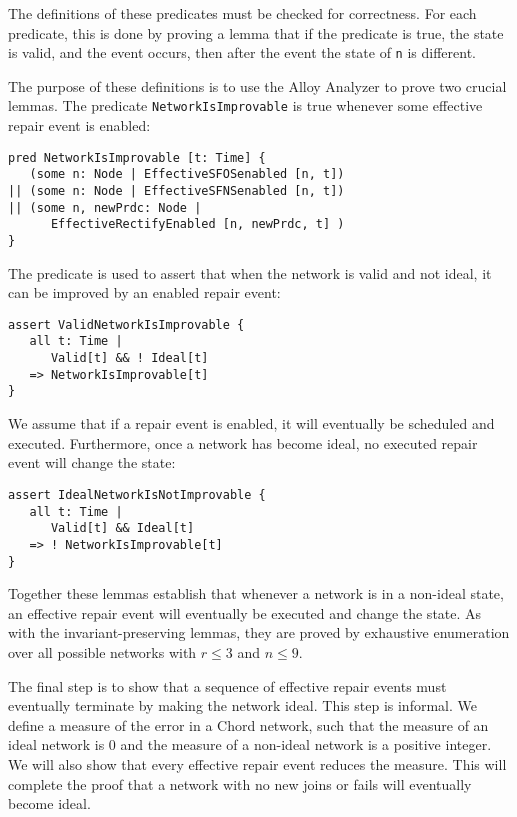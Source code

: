 \documentclass[conference]{IEEEtran}
\begin{document}
The definitions of these predicates must be checked for correctness.
For each predicate, this is done by proving a lemma that if the
predicate is true, the state is valid, and the event occurs, then
after the event the state of {\tt n} is different.

The purpose of these definitions is to use the Alloy Analyzer to
prove two crucial lemmas.
The predicate 
\small
{\tt NetworkIsImprovable}
\normalsize
is true whenever some effective
repair event is enabled:
\small
\begin{verbatim}
pred NetworkIsImprovable [t: Time] {
   (some n: Node | EffectiveSFOSenabled [n, t])
|| (some n: Node | EffectiveSFNSenabled [n, t])
|| (some n, newPrdc: Node | 
      EffectiveRectifyEnabled [n, newPrdc, t] )
}
\end{verbatim}
\normalsize
The predicate is used to assert that when the network is valid and not
ideal, it can be improved by an enabled repair event:
\small
\begin{verbatim}
assert ValidNetworkIsImprovable {
   all t: Time | 
      Valid[t] && ! Ideal[t] 
   => NetworkIsImprovable[t]  
}
\end{verbatim}
\normalsize
We assume that if a repair event is enabled, it will eventually be
scheduled and executed.  Furthermore, once a network has become ideal,
no executed repair event will change the state:
\small
\begin{verbatim}
assert IdealNetworkIsNotImprovable {
   all t: Time | 
      Valid[t] && Ideal[t] 
   => ! NetworkIsImprovable[t]  
}
\end{verbatim}
\normalsize
Together these lemmas establish that whenever a network is in a
non-ideal state, an effective repair event will eventually be executed
and change the state.
As with the invariant-preserving lemmas, they are proved by
exhaustive enumeration over all possible networks with
$r \leq 3$ and $n \leq 9$.

The final step is to show that a sequence of effective repair events
must eventually terminate by making the network ideal. 
This step is informal.
We define a measure of the error in a Chord network, such that the 
measure of an ideal network is 0 and the measure of a non-ideal network
is a positive integer.
We will also show that
every effective repair event reduces the measure.
This will complete the proof
that a network with no new joins or fails will eventually
become ideal.
\end{document}
